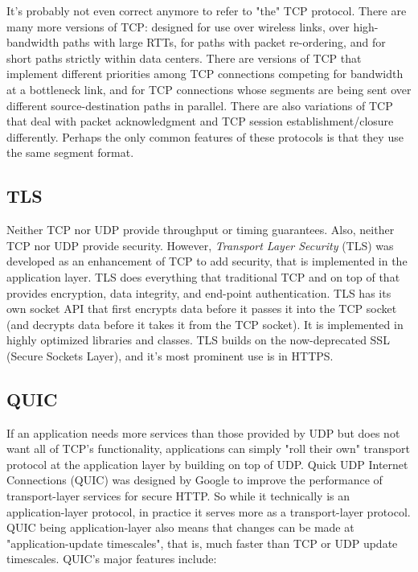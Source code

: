 \documentclass[8pt, table, xcdraw]{article}%
\begin{document}
It's probably not even correct anymore to refer to "the" TCP protocol. There are many more versions of TCP: designed for use over wireless links, over high-bandwidth paths with large RTTs, for paths with packet re-ordering, and for short paths strictly within data centers. There are versions of TCP that implement different priorities among TCP connections competing for bandwidth at a bottleneck link, and for TCP connections whose segments are being sent over different source-destination paths in parallel. There are also variations of TCP that deal with packet acknowledgment and TCP session establishment/closure differently. Perhaps the only common features of these protocols is that they use the same segment format.

\subsection{TLS}

Neither TCP nor UDP provide throughput or timing guarantees. Also, neither TCP nor UDP provide security. However, \emph{Transport Layer Security} (TLS) was developed as an enhancement of TCP to add security, that is implemented in the application layer. TLS does everything that traditional TCP and on top of that provides encryption, data integrity, and end-point authentication. TLS has its own socket API that first encrypts data before it passes it into the TCP socket (and decrypts data before it takes it from the TCP socket). It is implemented in highly optimized libraries and classes. TLS builds on the now-deprecated SSL (Secure Sockets Layer), and it's most prominent use is in HTTPS.

\subsection{QUIC} \label{ch:transport:quic}

If an application needs more services than those provided by UDP but does not want all of TCP's functionality, applications can simply "roll their own" transport protocol at the application layer by building on top of UDP. Quick UDP Internet Connections (QUIC) was designed by Google to improve the performance of transport-layer services for secure HTTP. So while it technically is an application-layer protocol, in practice it serves more as a transport-layer protocol. QUIC being application-layer also means that changes can be made at "application-update timescales", that is, much faster than
TCP or UDP update timescales. QUIC's major features include:
\end{document}
